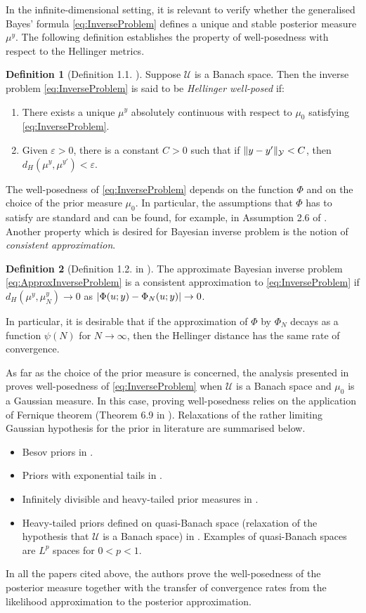 \documentclass{article}
\theoremstyle{remark}
\theoremstyle{definition}
\newtheorem{definition}{Definition}
\DeclarePairedDelimiter{\abs}{\lvert}{\rvert}
\DeclarePairedDelimiter{\norm}{\|}{\|}
\newcommand{\epl}{\varepsilon}
\newcommand{\ml}{\mathcal}
\begin{document}
In the infinite-dimensional setting, it is relevant to verify whether the generalised Bayes' formula \eqref{eq:InverseProblem} defines a unique and stable posterior measure $\mu^y$. The following definition establishes the property of well-posedness with respect to the Hellinger metrics.
\begin{definition}[Definition 1.1. \cite{HoN17}] Suppose $\ml U$ is a Banach space. Then the inverse problem \eqref{eq:InverseProblem} is said to be \textit{Hellinger well-posed} if:
	\begin{enumerate}
		\item There exists a unique $\mu^y$ absolutely continuous with respect to $\mu_0$ satisfying \eqref{eq:InverseProblem}.
		\item Given $\epl > 0$, there is a constant $C > 0$ such that if $\norm{y - y'}_{\ml Y} < C$, then $d_H(\mu^y, \mu^{y'}) < \epl$.
	\end{enumerate}
\end{definition}
The well-posedness of \eqref{eq:InverseProblem} depends on the function $\Phi$ and on the choice of the prior measure $\mu_0$. In particular, the assumptions that $\Phi$ has to satisfy are standard and can be found, for example, in Assumption 2.6 of \cite{Stu10}. Another property which is desired for Bayesian inverse problem is the notion of \textit{consistent approximation}. 
\begin{definition}[Definition 1.2. in \cite{HoN17}] The approximate Bayesian inverse problem \eqref{eq:ApproxInverseProblem} is a consistent approximation to \eqref{eq:InverseProblem} if $d_H(\mu^y, \mu^y_N) \to 0$ as $\abs{\Phi(u;y) - \Phi_N(u;y)} \to 0$.
\end{definition}
In particular, it is desirable that if the approximation of $\Phi$ by $\Phi_N$ decays as a function $\psi(N)$ for $N \to \infty$, then the Hellinger distance has the same rate of convergence.

As far as the choice of the prior measure is concerned, the analysis presented in \cite{Stu10} proves well-posedness of \eqref{eq:InverseProblem} when $\ml U$ is a Banach space and $\mu_0$ is a Gaussian measure. In this case, proving well-posedness relies on the application of Fernique theorem (Theorem 6.9 in \cite{Stu10}). Relaxations of the rather limiting Gaussian hypothesis for the prior in literature are summarised below.
\begin{itemize}
	\item Besov priors in \cite{DHS12}.
	\item Priors with exponential tails in \cite{HoN17}.
	\item Infinitely divisible and heavy-tailed prior measures in \cite{Hos17}.
	\item Heavy-tailed priors defined on quasi-Banach space (relaxation of the hypothesis that $\ml U$ is a Banach space) in \cite{Sul17}. Examples of quasi-Banach spaces are $L^p$ spaces for $0 < p < 1$.
\end{itemize}
In all the papers cited above, the authors prove the well-posedness of the posterior measure together with the transfer of convergence rates from the likelihood approximation to the posterior approximation. 
\end{document}
